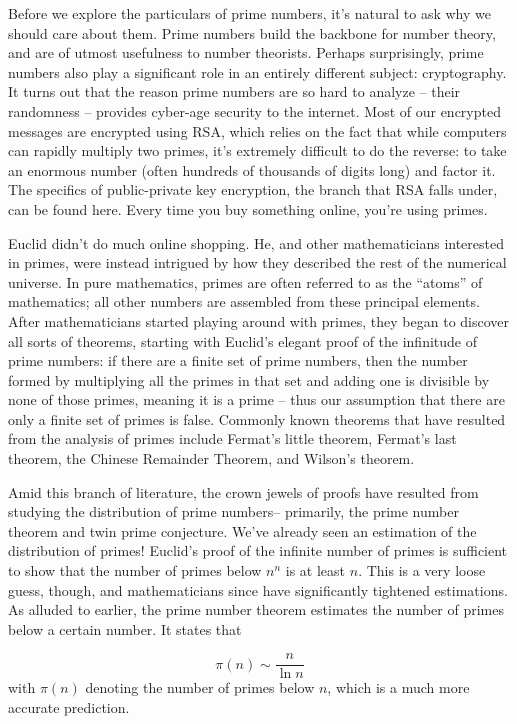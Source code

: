 \documentclass{article}
\begin{document}
\begin{multicols}{3}
Before we explore the particulars of prime numbers, it’s natural to ask why we should care about them. Prime numbers build the backbone for number theory, and are of utmost usefulness to number theorists. Perhaps surprisingly, prime numbers also play a significant role in an entirely different subject: cryptography. It turns out that the reason prime numbers are so hard to analyze – their randomness – provides cyber-age security to the internet. Most of our encrypted messages are encrypted using RSA, which relies on the fact that while computers can rapidly multiply two primes, it’s extremely difficult to do the reverse: to take an enormous number (often hundreds of thousands of digits long) and factor it. The specifics of public-private key encryption, the branch that RSA falls under, can be found here. Every time you buy something online, you're using primes.

Euclid didn't do much online shopping. He, and other mathematicians interested in primes, were instead intrigued by how they described the rest of the numerical universe. In pure mathematics, primes are often referred to as the “atoms” of mathematics; all other numbers are assembled from these principal elements. After mathematicians started playing around with primes, they began to discover all sorts of theorems, starting with Euclid’s elegant proof of the infinitude of prime numbers: if there are a finite set of prime numbers, then the number formed by multiplying all the primes in that set and adding one is divisible by none of those primes, meaning it is a prime – thus our assumption that there are only a finite set of primes is false. Commonly known theorems that have resulted from the analysis of primes include Fermat’s little theorem, Fermat’s last theorem, the Chinese Remainder Theorem, and Wilson’s theorem.

Amid this branch of literature, the crown jewels of proofs have resulted from studying the distribution of prime numbers– primarily, the prime number theorem and twin prime conjecture. We’ve already seen an estimation of the distribution of primes! Euclid’s proof of the infinite number of primes is sufficient to show that the number of primes below $n^n$ is at least $n$. This is a very loose guess, though, and mathematicians since have significantly tightened estimations. As alluded to earlier, the prime number theorem estimates the number of primes below a certain number. It states that

\[
\pi (n) \sim \frac n{\ln n}
\]
with $\pi(n)$ denoting the number of primes below $n$, which is a much more accurate prediction. 


\end{multicols}
\end{document}
